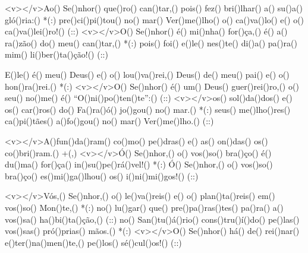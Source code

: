 <v></v>Ao() Se()nhor() que()ro() can()tar,() pois() fez() bri()lhar() a() su()a() gló()ria:() *(:)
pre()ci()pi()tou() no() mar() Ver()me()lho() o() ca()va()lo() e() o() ca()va()lei()ro!() (::)
<v></v>O() Se()nhor() é() mi()nha() for()ça,() é() a() ra()zão() do() meu() can()tar,() *(:)
pois() foi() e()le() nes()te() di()a() pa()ra() mim() li()ber()ta()ção!() (::)

E()le() é() meu() Deus() e() o() lou()va()rei,() Deus() de() meu() pai() e() o() hon()ra()rei.() *(:)
<v></v>O() Se()nhor() é() um() Deus() guer()rei()ro,() o() seu() no()me() é() ``O()ni()po()ten()te'':() (::)
<v></v>os() sol()da()dos() e() os() car()ros() do() Fa()ra()ó() jo()gou() no() mar.() *(:)
seus() me()lho()res() ca()pi()tães() a()fo()gou() no() mar() Ver()me()lho.() (::)

<v></v>A()fun()da()ram() co()mo() pe()dras() e() as() on()das() os() co()bri()ram.() +(,)
<v></v>Ó() Se()nhor,() o() vos()so() bra()ço() é() du()ma() for()ça() in()su()pe()rá()vel!() *(:)
Ó() Se()nhor,() o() vos()so() bra()ço() es()mi()ga()lhou() os() i()ni()mi()gos!() (::)

<v></v>Vós,() Se()nhor,() o() le()va()reis() e() o() plan()ta()reis() em() vos()so() Mon()te,() *(:)
no() lu()gar() que() pre()pa()ras()tes() pa()ra() a() vos()sa() ha()bi()ta()ção,() (::)
no() San()tu()á()rio() cons()tru()í()do() pe()las() vos()sas() pró()prias() mãos.() *(:)
<v></v>O() Se()nhor() há() de() rei()nar() e()ter()na()men()te,() pe()los() sé()cul()os!() (::)